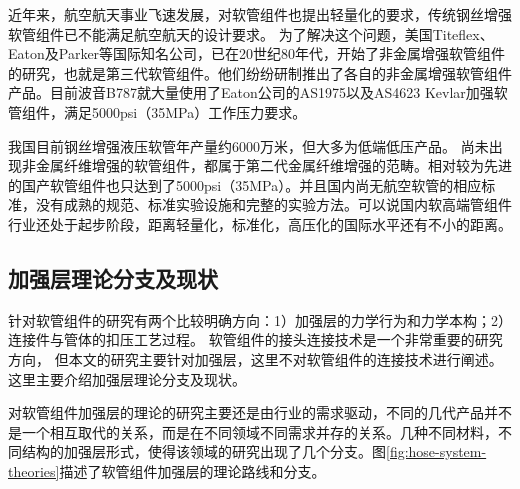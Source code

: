 近年来，航空航天事业飞速发展，对软管组件也提出轻量化的要求，传统钢丝增强软管组件已不能满足航空航天的设计要求。
为了解决这个问题，美国Titeflex、Eaton及Parker等国际知名公司，已在20世纪80年代，开始了非金属增强软管组件的研究，也就是第三代软管组件。他们纷纷研制推出了各自的非金属增强软管组件产品。目前波音B787就大量使用了Eaton公司的AS1975以及AS4623 Kevlar加强软管组件，满足5000psi（35MPa）工作压力要求。

\begin{figure}[!htbp]
	\centering
	\hspace{0.5cm}
	\label{fig:kevlarhose}
\end{figure}


我国目前钢丝增强液压软管年产量约6000万米\cite{xuhaitao2013}，但大多为低端低压产品。
尚未出现非金属纤维增强的软管组件，都属于第二代金属纤维增强的范畴。相对较为先进的国产软管组件也只达到了5000psi（35MPa）。并且国内尚无航空软管的相应标准，没有成熟的规范、标准实验设施和完整的实验方法。可以说国内软高端管组件行业还处于起步阶段，距离轻量化，标准化，高压化的国际水平还有不小的距离。



\subsection{加强层理论分支及现状}
针对软管组件的研究有两个比较明确方向：1）加强层的力学行为和力学本构；2）连接件与管体的扣压工艺过程。
软管组件的接头连接技术是一个非常重要的研究方向，
但本文的研究主要针对加强层，这里不对软管组件的连接技术进行阐述。这里主要介绍加强层理论分支及现状。


对软管组件加强层的理论的研究主要还是由行业的需求驱动，不同的几代产品并不是一个相互取代的关系，而是在不同领域不同需求并存的关系。几种不同材料，不同结构的加强层形式，使得该领域的研究出现了几个分支。图\ref{fig:hose-system-theories}描述了软管组件加强层的理论路线和分支。


